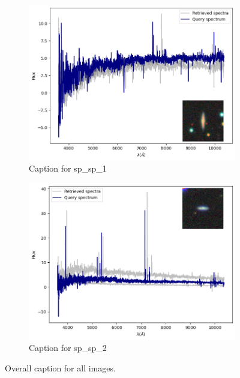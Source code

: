\documentclass[a4paper,12pt]{article}
\begin{document}
\begin{figure}[H]
    \begin{subfigure}[b]{0.45\textwidth}
        \centering
        \includegraphics[width=\textwidth]{../figures/spectral_retrieval_sp_sp_1}
        \caption{Caption for sp\_sp\_1}
        \label{fig:sp_sp_1}
    \end{subfigure}%
    \hfill
    \begin{subfigure}[b]{0.45\textwidth}
        \centering
        \includegraphics[width=\textwidth]{../figures/spectral_retrieval_sp_sp_2}
        \caption{Caption for sp\_sp\_2}
        \label{fig:sp_sp_2}
    \end{subfigure}

    \caption{Overall caption for all images.}
    \label{fig:spectral_retrieval}
\end{figure}
\end{document}

